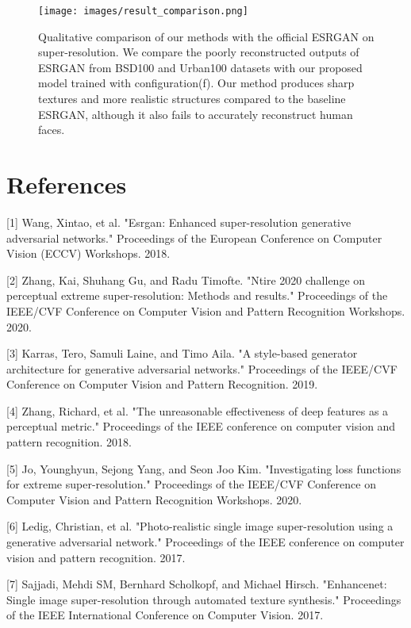 \documentclass{article}
\begin{document}
\begin{figure}
    \centering
    \texttt{[image: images/result\_comparison.png]}
    \caption{Qualitative comparison of our methods with the official ESRGAN on  super-resolution. We compare the poorly reconstructed outputs of ESRGAN from BSD100 and Urban100 datasets with our proposed model trained with configuration(f). Our method produces sharp textures and more realistic structures compared to the baseline ESRGAN, although it also fails to accurately reconstruct human faces.}
\end{figure}

\section*{References}

\medskip

\small

[1] Wang, Xintao, et al. "Esrgan: Enhanced super-resolution generative adversarial networks." Proceedings of the European Conference on Computer Vision (ECCV) Workshops. 2018.

[2] Zhang, Kai, Shuhang Gu, and Radu Timofte. "Ntire 2020 challenge on perceptual extreme super-resolution: Methods and results." Proceedings of the IEEE/CVF Conference on Computer Vision and Pattern Recognition Workshops. 2020.

[3] Karras, Tero, Samuli Laine, and Timo Aila. "A style-based generator architecture for generative adversarial networks." Proceedings of the IEEE/CVF Conference on Computer Vision and Pattern Recognition. 2019.

[4] Zhang, Richard, et al. "The unreasonable effectiveness of deep features as a perceptual metric." Proceedings of the IEEE conference on computer vision and pattern recognition. 2018.

[5] Jo, Younghyun, Sejong Yang, and Seon Joo Kim. "Investigating loss functions for extreme super-resolution." Proceedings of the IEEE/CVF Conference on Computer Vision and Pattern Recognition Workshops. 2020.

[6] Ledig, Christian, et al. "Photo-realistic single image super-resolution using a generative adversarial network." Proceedings of the IEEE conference on computer vision and pattern recognition. 2017.

[7] Sajjadi, Mehdi SM, Bernhard Scholkopf, and Michael Hirsch. "Enhancenet: Single image super-resolution through automated texture synthesis." Proceedings of the IEEE International Conference on Computer Vision. 2017.
\end{document}
